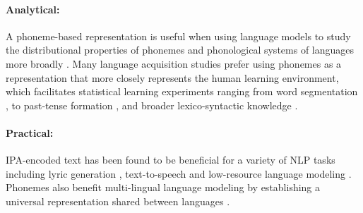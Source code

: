 \paragraph{Analytical:} A phoneme-based representation is useful when using language models to study the distributional properties of phonemes \citep{mayer-2020-phonology-distribution} and phonological systems of languages more broadly \citep{eden-2018-phonological-distance}. Many language acquisition studies prefer using phonemes as a representation that more closely represents the human learning environment, which facilitates statistical learning experiments ranging from word segmentation \citep{Coltekin2017}, to past-tense formation \citep{kirov-2018-recurrent}, and broader lexico-syntactic knowledge \citep{lavechin}.

\paragraph{Practical:} IPA-encoded text has been found to be beneficial for a variety of NLP tasks including lyric generation \citep{ding-2024-songcomposer}, text-to-speech \citep{sundararaman-2021-phonemebert, li-2023-phoneme-level-bert} and low-resource language modeling \citep{leong-whitenack-2022-phone}. Phonemes also benefit multi-lingual language modeling by establishing a universal representation shared between languages \citep{feng-2023-language-universal-phonetic, zhu-etal-2024-taste}. 




